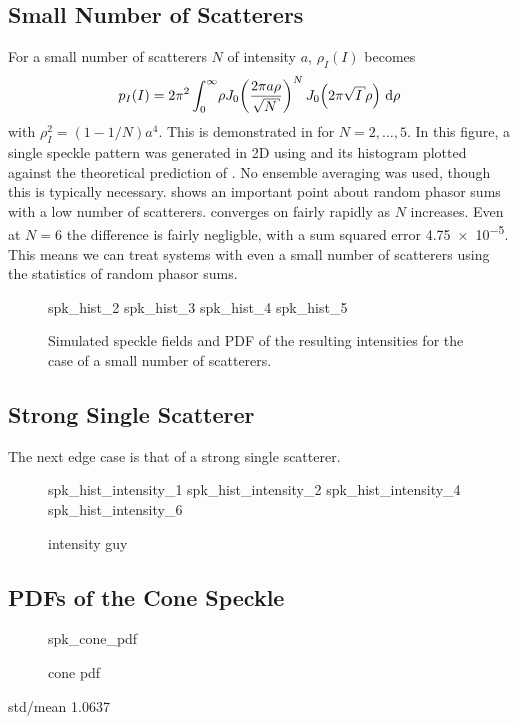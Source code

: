 \subsection{Small Number of Scatterers}
For a small number of scatterers $N$ of intensity $a$, $\rho_I(I)$ becomes
\begin{equation}
p_I(I) = 2\pi^2 \int_0^\infty\! \rho J_0\!\left(\frac{2\pi a
\rho}{\sqrt{N}}\right)^N J_0\!\left(2\pi\sqrt{I}\rho\right)\md\rho
\label{eqn:smallscatteqn}
\end{equation}
with $\rho_I^2=(1-1/N)a^4$.  This is demonstrated in  for
$N=2,\ldots,5$.  In this figure, a single speckle pattern was generated in 2D
using  and its histogram plotted against the
theoretical prediction of .  No ensemble
averaging was used, though this is typically necessary.
 shows an important point about random phasor sums
with a low number of scatterers.   converges on
 fairly rapidly as $N$ increases.  Even at $N=6$ the
difference is fairly negligble, with a sum squared error \num{4.75e-5}.
This means we can treat systems with even a small number of scatterers
using the statistics of random phasor sums.
\begin{figure}[ht]
\centering
{spk_hist_2}
{spk_hist_3}
{spk_hist_4}
{spk_hist_5}
\caption{Simulated speckle fields and PDF of the resulting intensities for
the case of a small number of scatterers.}
\label{fig:lowscatthist}
\end{figure}

\subsection{Strong Single Scatterer}
The next edge case is that of a strong single scatterer.
\begin{figure}[ht]
\centering
{spk_hist_intensity_1}
{spk_hist_intensity_2}
{spk_hist_intensity_4}
{spk_hist_intensity_6}
\caption{intensity guy}
\label{fig:lowscatthist}
\end{figure}

\subsection{PDFs of the Cone Speckle}
\begin{figure}[ht]
\centering
{spk_cone_pdf}
\caption{cone pdf}
\label{fig:conepdf}
\end{figure}

std/mean 1.0637


